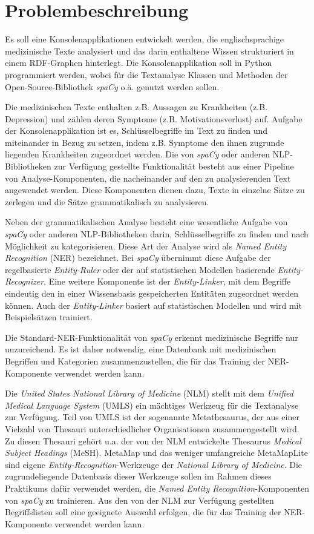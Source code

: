 \section{Problembeschreibung}
\label{sec:problembeschreibung}

Es soll eine Konsolenapplikationen entwickelt werden, die englischsprachige medizinische Texte analysiert und das darin enthaltene Wissen strukturiert in einem RDF-Graphen hinterlegt. Die Konsolenapplikation soll in Python programmiert werden, wobei für die Textanalyse Klassen und Methoden der Open-Source-Bibliothek \emph{spaCy} o.ä. genutzt werden sollen.

Die medizinischen Texte enthalten z.B. Aussagen zu Krankheiten (z.B. Depression) und zählen deren Symptome (z.B. Motivationsverlust) auf. Aufgabe der Konsolenapplikation ist es, Schlüsselbegriffe im Text zu finden und miteinander in Bezug zu setzen, indem z.B. Symptome den ihnen zugrunde liegenden Krankheiten zugeordnet werden. Die von \emph{spaCy} oder anderen NLP-Bibliotheken zur Verfügung gestellte Funktionalität besteht aus einer Pipeline von Analyse-Komponenten, die nacheinander auf den zu analysierenden Text angewendet werden. Diese Komponenten dienen dazu, Texte in einzelne Sätze zu zerlegen und die Sätze grammatikalisch zu analysieren.

Neben der grammatikalischen Analyse besteht eine wesentliche Aufgabe von \emph{spaCy} oder anderen NLP-Bibliotheken darin, Schlüsselbegriffe zu finden und nach Möglichkeit zu kategorisieren. Diese Art der Analyse wird als \emph{Named Entity Recognition} (NER) bezeichnet. Bei \emph{spaCy} übernimmt diese Aufgabe der regelbasierte \emph{Entity-Ruler} oder der auf statistischen Modellen basierende \emph{Entity-Recognizer}. Eine weitere Komponente ist der \emph{Entity-Linker}, mit dem Begriffe eindeutig den in einer Wissensbasis gespeicherten Entitäten zugeordnet werden können. Auch der \emph{Entity-Linker} basiert auf statistischen Modellen und wird mit Beispielsätzen trainiert.

Die Standard-NER-Funktionalität von \emph{spaCy} erkennt medizinische Begriffe nur unzureichend. Es ist daher notwendig, eine Datenbank mit medizinischen Begriffen und Kategorien zusammenzustellen, die für das Training der NER-Komponente verwendet werden kann.

Die \emph{United States National Library of Medicine} (NLM) stellt mit dem \emph{Unified Medical Language System} (UMLS) ein mächtiges Werkzeug für die Textanalyse zur Verfügung. Teil von UMLS ist der sogenannte Metathesaurus, der aus einer Vielzahl von Thesauri unterschiedlicher Organisationen zusammengestellt wird. Zu diesen Thesauri gehört u.a. der von der NLM entwickelte Thesaurus \emph{Medical Subject Headings} (MeSH). MetaMap und das weniger umfangreiche MetaMapLite sind eigene \emph{Entity-Recognition}-Werkzeuge der \emph{National Library of Medicine}. Die zugrundeliegende Datenbasis dieser Werkzeuge sollen im Rahmen dieses Praktikums dafür verwendet werden, die \emph{Named Entity Recognition}-Komponenten von \emph{spaCy} zu trainieren. Aus den von der NLM zur Verfügung gestellten Begriffslisten soll eine geeignete Auswahl erfolgen, die für das Training der NER-Komponente verwendet werden kann.

